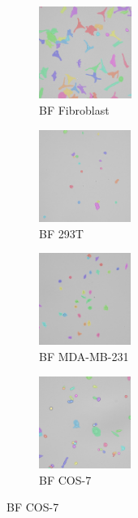 \documentclass[../cellseek_paper.tex]{subfiles}
\begin{document}
\begin{figure}[H]
  \centering
  \begin{subfigure}{0.23\textwidth}
    \centering
    \includegraphics[width=\textwidth,height=3cm]{images/examples/fibroblast_segmented.jpg}
    \caption{\footnotesize BF Fibroblast}
    \label{fig:fibroblast}
  \end{subfigure}
  \hfill
  \begin{subfigure}{0.23\textwidth}
    \centering
    \includegraphics[width=\textwidth,height=3cm]{images/examples/293t_segmented.jpg}
    \caption{\footnotesize BF 293T}
    \label{fig:293t}
  \end{subfigure}
  \hfill
  \begin{subfigure}{0.23\textwidth}
    \centering
    \includegraphics[width=\textwidth,height=3cm]{images/examples/mda_md_231_segmented.jpg}
    \caption{\footnotesize BF MDA-MB-231}
    \label{fig:mda}
  \end{subfigure}
  \hfill
  \begin{subfigure}{0.23\textwidth}
    \centering
    \includegraphics[width=\textwidth,height=3cm]{images/examples/cos7_segmented.jpg}
    \caption{\footnotesize BF COS-7}
    \label{fig:cos7}
  \end{subfigure}


\end{figure}
\end{document}

